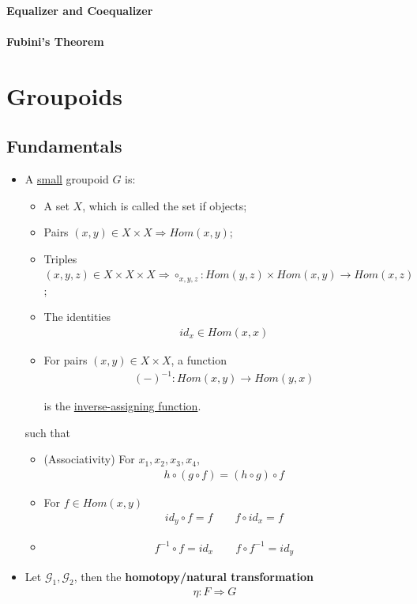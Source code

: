 \documentclass[Total.tex]{subfiles}
\begin{document}
				\subsubsection{Equalizer and Coequalizer}
				
				\subsubsection{Fubini's Theorem}
						
	\chapter{Groupoids}
		\section{Fundamentals}
			\begin{Def}
				\begin{itemize}
					\item 
					A \underline{small} groupoid $G$ is:
					\begin{itemize}
						\item A set $X$, which is called the set if objects;
						\item Pairs $(x,y)\in X\times X\Rightarrow Hom(x,y)$;
						\item Triples $(x,y,z)\in X\times X\times X\Rightarrow \circ_{x,y,z}:Hom(y,z)\times Hom(x,y)\rightarrow Hom(x,z)$;
						\item The identities
						\begin{gather*}
							id_x\in Hom(x,x)
						\end{gather*}
						\item For pairs $(x,y)\in X\times X$, a function
						\begin{gather*}
							(-)^{-1}:Hom(x,y)\rightarrow Hom(y,x)
						\end{gather*}
						
						is the \underline{inverse-assigning function}.
					\end{itemize}
					
					such that 
					\begin{itemize}
						\item (Associativity)  For $x_1,x_2,x_3,x_4$, 
						\begin{gather*}
							h\circ (g\circ f)=(h\circ g)\circ f
						\end{gather*}
						\item For $f\in Hom(x,y)$
						\begin{gather*}
							id_y\circ f=f\qquad f\circ id_x=f
						\end{gather*}
						\item 
						\begin{gather*}
							f^{-1}\circ f=id_x\qquad f\circ f^{-1}=id_y
						\end{gather*}
					\end{itemize}
					\item Let $\mathcal{G}_1,\mathcal{G}_2$, then the \textbf{homotopy/natural transformation}
					\begin{gather*}
						\eta:F\Rightarrow G
					\end{gather*}
					

\end{itemize}
\end{Def}
\end{document}
